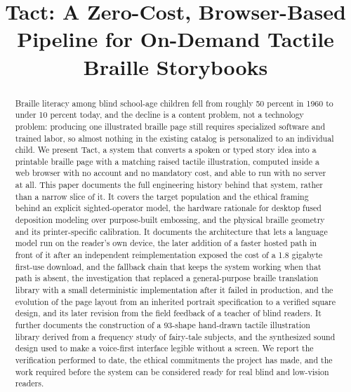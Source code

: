 \documentclass[conference]{IEEEtran}
\begin{document}
\title{Tact: A Zero-Cost, Browser-Based Pipeline for On-Demand Tactile Braille Storybooks}

\author{
}

\maketitle

\begin{abstract}
Braille literacy among blind school-age children fell from roughly 50 percent in 1960 to under 10 percent today, and the decline is a content problem, not a technology problem: producing one illustrated braille page still requires specialized software and trained labor, so almost nothing in the existing catalog is personalized to an individual child. We present Tact, a system that converts a spoken or typed story idea into a printable braille page with a matching raised tactile illustration, computed inside a web browser with no account and no mandatory cost, and able to run with no server at all. This paper documents the full engineering history behind that system, rather than a narrow slice of it. It covers the target population and the ethical framing behind an explicit sighted-operator model, the hardware rationale for desktop fused deposition modeling over purpose-built embossing, and the physical braille geometry and its printer-specific calibration. It documents the architecture that lets a language model run on the reader's own device, the later addition of a faster hosted path in front of it after an independent reimplementation exposed the cost of a 1.8 gigabyte first-use download, and the fallback chain that keeps the system working when that path is absent, the investigation that replaced a general-purpose braille translation library with a small deterministic implementation after it failed in production, and the evolution of the page layout from an inherited portrait specification to a verified square design, and its later revision from the field feedback of a teacher of blind readers. It further documents the construction of a 93-shape hand-drawn tactile illustration library derived from a frequency study of fairy-tale subjects, and the synthesized sound design used to make a voice-first interface legible without a screen. We report the verification performed to date, the ethical commitments the project has made, and the work required before the system can be considered ready for real blind and low-vision readers.
\end{abstract}
\end{document}
